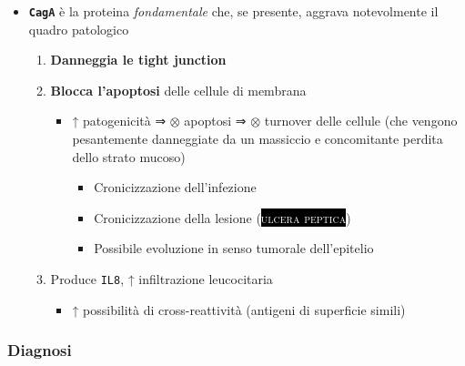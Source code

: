 \documentclass[italian,]{article}
\providecommand{\tightlist}{%
  \setlength{\itemsep}{0pt}\setlength{\parskip}{0pt}}
\newcommand{\pat}[1]{\colorbox{black}{\textcolor{white}{\textsc{#1}}}}
\newcommand{\ini}[0]{ $\otimes$ }                                       %
\begin{document}
\begin{itemize}
\tightlist
\item
  \textbf{\texttt{CagA}} è la proteina \emph{fondamentale} che, se
  presente, aggrava notevolmente il quadro patologico

  \begin{enumerate}
  \def\labelenumi{\arabic{enumi}.}
  \tightlist
  \item
    \textbf{Danneggia le tight junction}
  \item
    \textbf{Blocca l'apoptosi} delle cellule di membrana

    \begin{itemize}
    \tightlist
    \item
      ↑ patogenicità ⇒ \ini apoptosi ⇒ \ini turnover delle cellule (che
      vengono pesantemente danneggiate da un massiccio e concomitante
      perdita dello strato mucoso)

      \begin{itemize}
      \tightlist
      \item
        Cronicizzazione dell'infezione
      \item
        Cronicizzazione della lesione (\pat{ulcera peptica})
      \item
        Possibile evoluzione in senso tumorale dell'epitelio
      \end{itemize}
    \end{itemize}
  \item
    Produce \texttt{IL8}, ↑ infiltrazione leucocitaria

    \begin{itemize}
    \tightlist
    \item
      ↑ possibilità di cross-reattività (antigeni di superficie simili)
    \end{itemize}
  \end{enumerate}
\end{itemize}

\hypertarget{diagnosi-4}{%
\subsubsection{Diagnosi}\label{diagnosi-4}}
\end{document}
